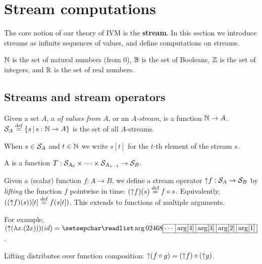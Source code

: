 \section{Stream computations}\label{sec:streams}

The core notion of our theory of IVM is the \textbf{stream}.  In this
section we introduce streams as infinite sequences of values, and
define computations on streams.

$\mathbb{N}$ is the set of natural numbers (from 0), $\mathbb{B}$ is the set of
Booleans, $\mathbb{Z}$ is the set of integers, and $\mathbb{R}$ is the set of real
numbers.

\vspace{-3ex}

\subsection{Streams and stream operators}\label{sec:notation}

\begin{definition}[stream]
Given a set $A$, a  \emph{of values from $A$}, or an
\emph{$A$-stream}, is a function $\mathbb{N} \rightarrow A$.  $\mathcal{S}_{A}
\stackrel{\textrm{\scriptsize def}}{=} \{ s \,|\, s : \mathbb{N} \to A \}$ is the set of all $A$-streams.
\end{definition}

When $s\in\mathcal{S}_{A}$ and $t\in\mathbb{N}$ we
write $s[t]$ for the $t$-th element of the stream $s$.

\begin{definition}
A  is a function
$T:\mathcal{S}_{A_0}\times\cdots\times\mathcal{S}_{A_{n-1}}\to\mathcal{S}_{B}$.
\end{definition}

\begin{definition}[lifting]
Given a (scalar) function $f: A \to B$,
we define a stream operator ${\uparrow}f :\mathcal{S}_{A} \to \mathcal{S}_{B}$
by \emph{lifting} the function $f$ pointwise in time: $({\uparrow}f)(s) \stackrel{\textrm{\scriptsize def}}{=} f \circ s$.
Equivalently, $(({\uparrow}f)(s))[t] \stackrel{\textrm{\scriptsize def}}{=} f(s[t])$.
This extends to functions of multiple arguments.
\end{definition}

\ifstreamexamples
For example, $(\lift{(\lambda x.(2x))})(id) = \sv{0 2 4 6 8}$.
\fi

\begin{proposition}[distributivity]\label{prop:distributivity}
Lifting distributes over function composition:
${\uparrow}(f \circ g) = ({\uparrow}f) \circ ({\uparrow}g)$.
\end{proposition}
\begin{comment}
\begin{proof}
This is easily proved by using associativity of function composition:
$\forall s~.~(\lift{(f \circ g)})(s) = (f \circ g) \circ s =
f \circ (g \circ s) = f \circ (\lift{g})(s) = (\lift{f})((\lift{g})(s)) =
(\lift{f} \circ \lift{g})(s).$\qed
\end{proof}
\end{comment}

